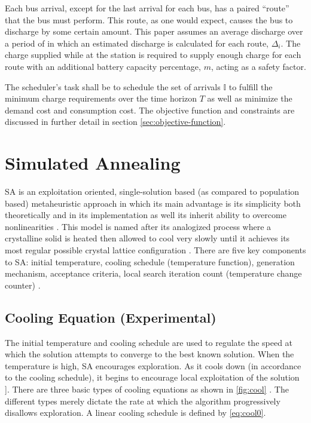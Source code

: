 \documentclass[11pt,a4paper,final]{article}
\newcommand{\I}{\mathbb{I}}                 %
\begin{document}
Each bus arrival, except for the last arrival for each bus, has a paired ``route'' that the bus must perform. This route,
as one would expect, causes the bus to discharge by some certain amount. This paper assumes an average discharge over a
period of in which an estimated discharge is calculated for each route, \(\Delta_i\). The charge supplied while at the station
is required to supply enough charge for each route with an additional battery capacity percentage, \(m\), acting as a
safety factor.

The scheduler's task shall be to schedule the set of arrivals \(\I\) to fulfill the minimum charge requirements over the
time horizon \(T\) as well as minimize the demand cost and consumption cost. The objective function and constraints are
discussed in further detail in section \ref{sec:objective-function}.
\section{Simulated Annealing}
\label{sec:simulated-annealing}
SA is an exploitation oriented, single-solution based (as compared to population based) metaheuristic approach in which
its main advantage is its simplicity both theoretically and in its implementation as well its inherit ability to
overcome nonlinearities \cite{gendreau-2018-handb-metah,radosavljevic-2018-metah-optim}. This model is named after its
analogized process where a crystalline solid is heated then allowed to cool very slowly until it achieves its most
regular possible crystal lattice configuration \cite{henderson-1989-theor-pract}. There are five key components to SA:
initial temperature, cooling schedule (temperature function), generation mechanism, acceptance criteria, local search
iteration count (temperature change counter) \cite{keller-2019-multi-objec}.

\subsection{Cooling Equation (Experimental)}
\label{cooling-equation-experimental}
The initial temperature and cooling schedule are used to regulate the speed at which the solution attempts to converge
to the best known solution. When the temperature is high, SA encourages exploration. As it cools down (in accordance to
the cooling schedule), it begins to encourage local exploitation of the solution
\cite{rutenbar-1989-simul-anneal-algor,henderson-1989-theor-pract}]. There are three basic types of cooling equations
as shown in \ref{fig:cool} \cite{keller-2019-multi-objec}. The different types merely dictate the rate at which the algorithm
progressively disallows exploration. A linear cooling schedule is defined by \ref{eq:cool0}.
\end{document}

